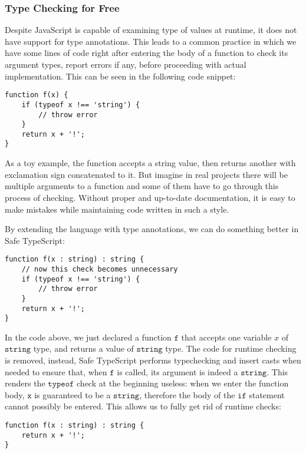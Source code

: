 \subsubsection{Type Checking for Free}

Despite JavaScript is capable of examining type of values at runtime,
it does not have support for type annotations.
This leads to a common practice in which we have some lines of code
right after entering the body of a function
to check its argument types, report errors if any, before
proceeding with actual implementation. This can be seen in the following code snippet:

\begin{verbatim}
function f(x) {
    if (typeof x !== 'string') {
        // throw error
    }
    return x + '!';
}
\end{verbatim}

As a toy example, the function accepts a string value,
then returns another with exclamation sign concatenated to it. 
But imagine in real projects there will be multiple arguments to a function
and some of them have to go through this process of checking.
Without proper and up-to-date documentation,
it is easy to make mistakes while maintaining code written in such a style.

By extending the language with type annotations,
we can do something better in Safe TypeScript:

\begin{verbatim}
function f(x : string) : string {
    // now this check becomes unnecessary
    if (typeof x !== 'string') {
        // throw error
    }
    return x + '!';
}
\end{verbatim}

In the code above, we just declared a function $\texttt{f}$ that accepts
one variable $x$ of $\texttt{string}$ type, and returns a value of $\texttt{string}$ type.
The code for runtime checking is removed, instead, Safe TypeScript performs typechecking
and insert casts when needed to ensure that,
when $\texttt{f}$ is called, its argument is indeed a $\texttt{string}$.
This renders the  $\texttt{typeof}$ check at the beginning useless:
when we enter the function body, $\texttt{x}$ is guaranteed to be a $\texttt{string}$,
therefore the body of the $\texttt{if}$ statement cannot possibly be entered.
This allows us to fully get rid of runtime checks:

\begin{verbatim}
function f(x : string) : string {
    return x + '!';
}
\end{verbatim}

